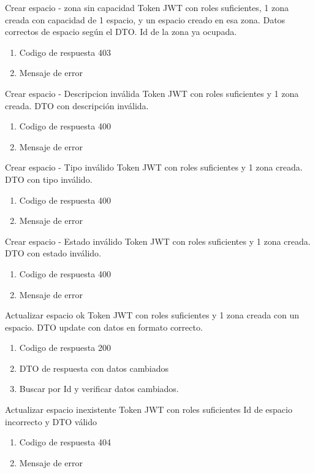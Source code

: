 {Crear espacio - zona sin capacidad}
{Token JWT con roles suficientes, 1 zona creada con capacidad de 1 espacio, y un espacio creado en esa zona.}
{Datos correctos de espacio según el DTO. Id de la zona ya ocupada.}
{\begin{enumerate} [leftmargin=*, nosep]
    \item Codigo de respuesta 403
    \item Mensaje de error
\end{enumerate}}

{Crear espacio - Descripcion inválida}
{Token JWT con roles suficientes y 1 zona creada.}
{DTO con descripción inválida.}
{\begin{enumerate} [leftmargin=*, nosep]
    \item Codigo de respuesta 400
    \item Mensaje de error
\end{enumerate}}

{Crear espacio - Tipo inválido}
{Token JWT con roles suficientes y 1 zona creada.}
{DTO con tipo inválido.}
{\begin{enumerate} [leftmargin=*, nosep]
    \item Codigo de respuesta 400
    \item Mensaje de error
\end{enumerate}}

{Crear espacio - Estado inválido}
{Token JWT con roles suficientes y 1 zona creada.}
{DTO con estado inválido.}
{\begin{enumerate} [leftmargin=*, nosep]
    \item Codigo de respuesta 400
    \item Mensaje de error
\end{enumerate}}

{Actualizar espacio ok}
{Token JWT con roles suficientes y 1 zona creada con un espacio.}
{DTO update con datos en formato correcto.}
{\begin{enumerate} [leftmargin=*, nosep]
    \item Codigo de respuesta 200
    \item DTO de respuesta con datos cambiados
    \item Buscar por Id y verificar datos cambiados.
\end{enumerate}}

{Actualizar espacio inexistente}
{Token JWT con roles suficientes}
{Id de espacio incorrecto y DTO válido}
{\begin{enumerate} [leftmargin=*, nosep]
    \item Codigo de respuesta 404
    \item Mensaje de error
\end{enumerate}}

